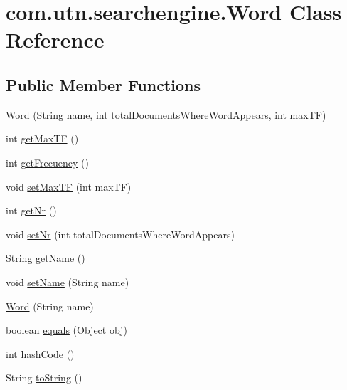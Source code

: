 \hypertarget{classcom_1_1utn_1_1searchengine_1_1_word}{\section{com.\-utn.\-searchengine.\-Word \-Class \-Reference}
\label{classcom_1_1utn_1_1searchengine_1_1_word}
}
\subsection*{\-Public \-Member \-Functions}
\begin{DoxyCompactItemize}
\item 
\hyperlink{classcom_1_1utn_1_1searchengine_1_1_word_acfa0d7c0aff58ad50f0f4f64de595d5d}{\-Word} (\-String name, int total\-Documents\-Where\-Word\-Appears, int max\-T\-F)
\item 
int \hyperlink{classcom_1_1utn_1_1searchengine_1_1_word_a53883c29360813b31317a02e33509ccf}{get\-Max\-T\-F} ()
\item 
int \hyperlink{classcom_1_1utn_1_1searchengine_1_1_word_a6c2e1e9cf9e602e6ab607a0115a52b47}{get\-Frecuency} ()
\item 
void \hyperlink{classcom_1_1utn_1_1searchengine_1_1_word_ae4417c3f8337126840eae260dcf15a78}{set\-Max\-T\-F} (int max\-T\-F)
\item 
int \hyperlink{classcom_1_1utn_1_1searchengine_1_1_word_a26c2057e690a42fe2488b70ce6809ee8}{get\-Nr} ()
\item 
void \hyperlink{classcom_1_1utn_1_1searchengine_1_1_word_aad1c1f3529a450769ed3436c4185d4d4}{set\-Nr} (int total\-Documents\-Where\-Word\-Appears)
\item 
\-String \hyperlink{classcom_1_1utn_1_1searchengine_1_1_word_a0178ae154e1b998a526042de4fe525be}{get\-Name} ()
\item 
void \hyperlink{classcom_1_1utn_1_1searchengine_1_1_word_a0ac5225074b4cb2d2704470a4f6b5fbb}{set\-Name} (\-String name)
\item 
\hyperlink{classcom_1_1utn_1_1searchengine_1_1_word_a42fdbfff11ee8e600899200ccceab3d0}{\-Word} (\-String name)
\item 
boolean \hyperlink{classcom_1_1utn_1_1searchengine_1_1_word_add316487c9dd1d0f6d2287a0088f1685}{equals} (\-Object obj)
\item 
int \hyperlink{classcom_1_1utn_1_1searchengine_1_1_word_a4bfa06d0fe386b84976af4bed36261d2}{hash\-Code} ()
\item 
\-String \hyperlink{classcom_1_1utn_1_1searchengine_1_1_word_a74d117f3e67ff411fa85189ea725e0bd}{to\-String} ()
\end{DoxyCompactItemize}


